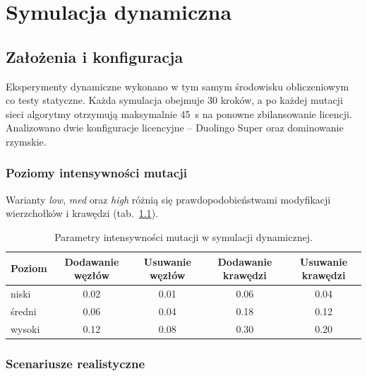 \chapter{Symulacja dynamiczna}\label{chap:dynamic}

\section{Założenia i konfiguracja}

Eksperymenty dynamiczne wykonano w tym samym środowisku obliczeniowym co testy statyczne. Każda symulacja obejmuje 30 kroków, a po każdej mutacji sieci algorytmy otrzymują maksymalnie 45~s na ponowne zbilansowanie licencji. Analizowano dwie konfiguracje licencyjne -- Duolingo Super oraz dominowanie rzymskie.

\subsection{Poziomy intensywności mutacji}

Warianty \emph{low}, \emph{med} oraz \emph{high} różnią się prawdopodobieństwami modyfikacji wierzchołków i krawędzi (tab.~\ref{tab:dyn-mutation-levels}).

\begin{table}[H]
  \centering
  \caption{Parametry intensywności mutacji w symulacji dynamicznej.}
  \label{tab:dyn-mutation-levels}
  \begin{tabular}{lcccc}
    \toprule
    \textbf{Poziom} & \textbf{Dodawanie węzłów} & \textbf{Usuwanie węzłów} & \textbf{Dodawanie krawędzi} & \textbf{Usuwanie krawędzi} \\
    \midrule
    niski           & 0.02                      & 0.01                     & 0.06                        & 0.04                       \\
    średni          & 0.06                      & 0.04                     & 0.18                        & 0.12                       \\
    wysoki          & 0.12                      & 0.08                     & 0.30                        & 0.20                       \\
  \end{tabular}
\end{table}

\subsection{Scenariusze realistyczne}

